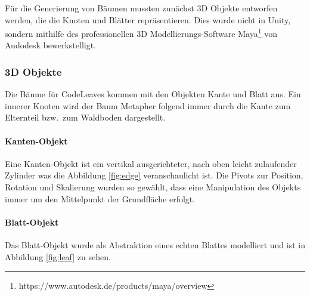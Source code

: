 Für die Generierung von Bäumen mussten zunächst 3D Objekte entworfen werden, die die Knoten und Blätter repräsentieren. Dies wurde nicht in Unity, sondern mithilfe des professionellen 3D Modellierungs-Software Maya\footnote{https://www.autodesk.de/products/maya/overview} von Audodesk bewerkstelligt.

\subsubsection*{3D Objekte}

Die Bäume für CodeLeaves kommen mit den Objekten Kante und Blatt aus. Ein innerer Knoten wird der Baum Metapher folgend immer durch die Kante zum Elternteil bzw.\ zum Waldboden dargestellt.

\paragraph{Kanten-Objekt} Eine Kanten-Objekt ist ein vertikal ausgerichteter, nach oben leicht zulaufender Zylinder was die Abbildung \ref{fig:edge} veranschaulicht ist. Die Pivots zur Position, Rotation und Skalierung wurden so gewählt, dass eine Manipulation des Objekts immer um den Mittelpunkt der Grundfläche erfolgt.\\

\paragraph{Blatt-Objekt} Das Blatt-Objekt wurde als Abstraktion eines echten Blattes modelliert und ist in Abbildung \ref{fig:leaf} zu sehen.\\

